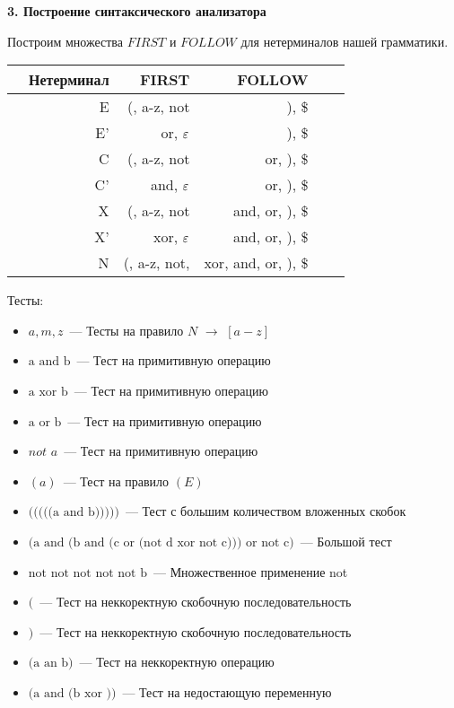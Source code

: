 \documentclass[11pt,a4paper,oneside]{article}
\begin{document}
\textbf{3. Построение синтаксического анализатора}
\newline                    
\newline

Построим множества $FIRST$ и $FOLLOW$ для нетерминалов нашей грамматики.

\begin{tabular}{|c||r|r|rrr||}
\hline
 & Нетерминал & FIRST & FOLLOW \\
\hline
\hline
 & E  & (, a-z, not  & ), \$ \\
 & E' & or, $\varepsilon$   & ), \$ \\
 & C  & (, a-z, not  & or, ), \$ \\
 & C' & and, $\varepsilon$  & or, ), \$ \\
 & X  & (, a-z, not  & and, or, ), \$ \\
 & X' & xor, $\varepsilon$  & and, or, ), \$ \\
 & N  & (, a-z, not, & xor, and, or, ), \$ \\
\hline
\end{tabular}
\newline

Тесты:

\begin{itemize}
 \item $a, m, z$~--- Тесты на правило $N$ $\rightarrow$ $[a-z]$
 \item $\mbox{a and b}$~--- Тест на примитивную операцию
 \item $\mbox{a xor b}$~--- Тест на примитивную операцию
 \item $\mbox{a or b}$~--- Тест на примитивную операцию
 \item $not$ $a$~--- Тест на примитивную операцию
 \item $(a)$~--- Тест на правило $(E)$
 \item $\mbox{(((((a and b)))))}$~--- Тест с большим количеством вложенных скобок
 \item $\mbox{(a and (b and (c or (not d xor not c))) or not c)}$~--- Большой тест
 \item $\mbox{not not not not not b}$~--- Множественное применение not
 \item $($~--- Тест на неккоректную скобочную последовательность
 \item $)$~--- Тест на неккоректную скобочную последовательность
 \item $\mbox{(a an b)}$~--- Тест на неккоректную операцию
 \item $\mbox{(a and (b xor ))}$~--- Тест на недостающую переменную
\end{itemize}
\end{document}
